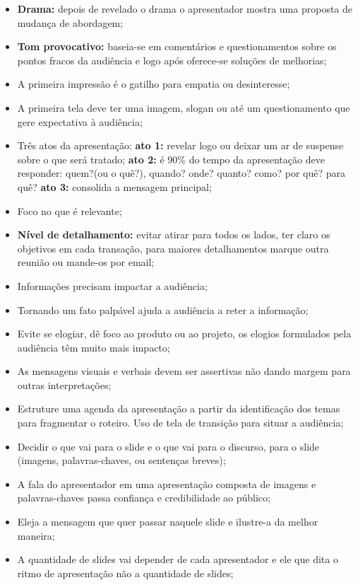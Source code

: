 \begin{itemize}
    \item \textbf{Drama:} depois de revelado o drama o apresentador mostra uma proposta de mudança de abordagem;
    \item \textbf{Tom provocativo:} baseia-se em comentários e questionamentos sobre os pontos fracos da audiência e logo após oferece-se soluções de melhorias;
    \item A primeira impressão é o gatilho para empatia ou desinteresse;
    \item A primeira tela deve ter uma imagem, slogan ou até um questionamento que gere expectativa à audiência;
    \item Três atos da apresentação: \textbf{ato 1:} revelar logo ou deixar um ar de suspense sobre o que será tratado; \textbf{ato 2:} é 90\% do tempo da apresentação deve responder: quem?(ou o quê?), quando? onde? quanto? como? por quê? para quê? \textbf{ato 3:} consolida a mensagem principal;
    \item Foco no que é relevante; 
    \item \textbf{Nível de detalhamento:} evitar atirar para todos os lados, ter claro os objetivos em cada transação, para maiores detalhamentos marque outra reunião ou mande-os por email;
    \item Informações precisam impactar a audiência;
    \item Tornando um fato palpável ajuda a audiência a reter a informação;
    \item Evite se elogiar, dê foco ao produto ou ao projeto, os elogios formulados pela audiência têm muito mais impacto;
    \item As mensagens visuais e verbais devem ser assertivas não dando margem para outras interpretações;
    \item Estruture uma agenda da apresentação a partir da identificação dos temas para fragmentar o roteiro. Uso de tela de transição para situar a audiência;
    \item Decidir o que vai para o slide e o que vai para o discurso, para o slide (imagens, palavras-chaves, ou sentenças breves);
    \item A fala do apresentador em uma apresentação composta de imagens e palavras-chaves passa confiança e credibilidade ao público;
    \item Eleja a mensagem que quer passar naquele slide e ilustre-a da melhor maneira;
    \item A quantidade de slides vai depender de cada apresentador e ele que dita o ritmo de apresentação não a quantidade de slides;

\end{itemize}
